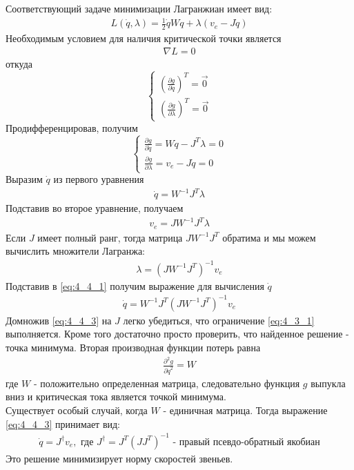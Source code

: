 Соответствующий задаче минимизации Лагранжиан имеет вид:
\begin{align*} 
	L(\dot q, \lambda) = \frac{1}{2}\dot q W \dot{q} + \lambda(v_{e} - J\dot q)
\end{align*} 
Необходимым условием для наличия критической точки является
\begin{align*}
	\nabla L = 0
\end{align*}
откуда
\[
	\begin{cases*}
		(\frac{\partial g}{\partial \dot q})^T = \vec{0}\\
		(\frac{\partial g}{\partial \lambda})^T = \vec{0}
	\end{cases*} 
\]
Продифференцировав, получим
\[
	\begin{cases}
		\frac{\partial g}{\partial \dot q} = W\dot{q} - J^{T}\lambda = 0\\
		\frac{\partial g}{\partial \lambda} = v_{e} - J\dot{q} = 0
	\end{cases}
\]
Выразим $\dot q$ из первого уравнения
\begin{align} \label{eq:4_4_1}
	\dot q = W^{-1}J^{T}\lambda
\end{align}
 Подставив во второе уравнение, получаем
\begin{align*}
	v_{e} = JW^{-1}J^{T}\lambda
\end{align*}
Если $J$ имеет полный ранг, тогда матрица $JW^{-1}J^{T}$ обратима и мы можем вычислить множители Лагранжа:
\begin{align} \label{eq:4_4_2}
	\lambda = (JW^{-1}J^{T})^{-1}v_{e}
\end{align}
Подставив в \ref{eq:4_4_1} получим выражение для вычисления $\dot q$
\begin{align} \label{eq:4_4_3}
	\dot q = W^{-1}J^{T}(JW^{-1}J^{T})^{-1}v_{e}
\end{align}
Домножив \ref{eq:4_4_3} на $J$ легко убедиться, что ограничение \ref{eq:4_3_1} выполняется. Кроме того достаточно просто проверить, что найденное решение - точка минимума. Вторая производная функции потерь равна
\begin{align*}
	\frac{\partial^{2}g}{\partial{\dot q}^2} = W
\end{align*}
где $W$ - положительно определенная матрица, следовательно функция $g$ выпукла вниз и критическая тока является точкой минимума.
\\

Существует особый случай, когда $W$ - единичная матрица. Тогда выражение \ref{eq:4_4_3} принимает вид:
\begin{align}
	\dot q = J^{\dagger}v_{e}, \text{ где $J^{\dagger} = J^{T}(JJ^{T})^{-1}$ - правый псевдо-обратный якобиан}
\end{align}
Это решение минимизирует норму скоростей звеньев.

